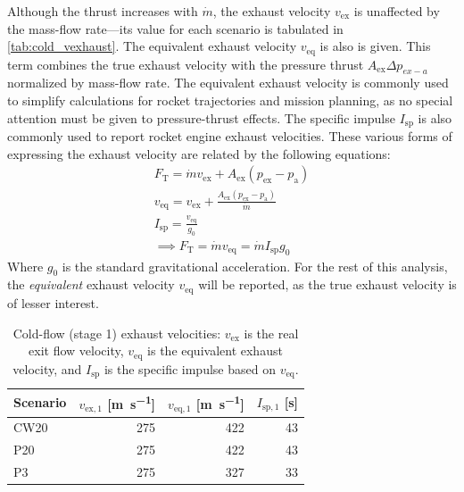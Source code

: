             Although the thrust increases with $\dot{m}$, the exhaust velocity $v_\mathrm{ex}$ is unaffected by the mass-flow rate---its value for each scenario is tabulated in \autoref{tab:cold_vexhaust}. The equivalent exhaust velocity $v_\mathrm{eq}$ is also is given. This term combines the true exhaust velocity with the pressure thrust $A_\mathrm{ex}\Delta p_{ex-a}$ normalized by mass-flow rate. The equivalent exhaust velocity is commonly used to simplify calculations for rocket trajectories and mission planning, as no special attention must be given to pressure-thrust effects. The specific impulse $I_\mathrm{sp}$ is also commonly used to report rocket engine exhaust velocities. These various forms of expressing the exhaust velocity are related by the following equations:
            \begin{gather*}
                F_\mathrm{T} = \dot{m}v_\mathrm{ex} + A_\mathrm{ex}(p_\mathrm{ex}-p_\mathrm{a}) \\
                v_\mathrm{eq} = v_\mathrm{ex} + \frac{A_\mathrm{ex}(p_\mathrm{ex}-p_\mathrm{a})}{\dot{m}} \\
                I_\mathrm{sp} = \frac{v_\mathrm{eq}}{g_0} \\
                \implies F_\mathrm{T} = \dot{m}v_\mathrm{eq} = \dot{m}I_\mathrm{sp}g_0
            \end{gather*}
            Where $g_0$ is the standard gravitational acceleration. For the rest of this analysis, the \emph{equivalent} exhaust velocity $v_\mathrm{eq}$ will be reported, as the true exhaust velocity is of lesser interest.

            \begin{table}[h]
                \centering
                \caption[Cold-flow exhaust velocities]{Cold-flow (stage 1) exhaust velocities: $v_\mathrm{ex}$ is the real exit flow velocity, $v_\mathrm{eq}$ is the equivalent exhaust velocity, and $I_\mathrm{sp}$ is the specific impulse based on $v_\mathrm{eq}$.}
                \label{tab:cold_vexhaust}
                \begin{tabular}{@{}lrrr@{}}
                    \toprule
                    Scenario    & $v_\mathrm{ex,1}$ [\unit{m.s^{-1}}] & $v_\mathrm{eq,1}$ [\unit{m.s^{-1}}] & $I_\mathrm{sp,1}$ [s] \\
                    \midrule
                    CW20    & 275   &  422  & 43 \\
                    P20     & 275   &  422  & 43 \\
                    P3      & 275   &  327  & 33 \\
                    \bottomrule
                \end{tabular}
            \end{table}

